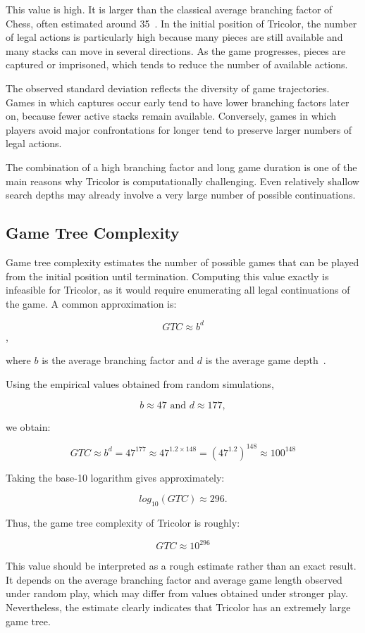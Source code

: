 This value is high. It is larger than the classical average branching factor of Chess, often estimated around 35~\cite{shannon1950chess2}. In the initial position of Tricolor, the number of legal actions is particularly high because many pieces are still available and many stacks can move in several directions. As the game progresses, pieces are captured or imprisoned, which tends to reduce the number of available actions.

The observed standard deviation reflects the diversity of game trajectories. Games in which captures occur early tend to have lower branching factors later on, because fewer active stacks remain available. Conversely, games in which players avoid major confrontations for longer tend to preserve larger numbers of legal actions.

The combination of a high branching factor and long game duration is one of the main reasons why Tricolor is computationally challenging. Even relatively shallow search depths may already involve a very large number of possible continuations.

\subsection{Game Tree Complexity}

Game tree complexity estimates the number of possible games that can be played from the initial position until termination. Computing this value exactly is infeasible for Tricolor, as it would require enumerating all legal continuations of the game. A common approximation is:

\[ GTC \approx b^d \],

where $b$ is the average branching factor and $d$ is the average game depth~\cite{shannon1950chess2}.

Using the empirical values obtained from random simulations,

\[ b\approx47 \text{ and } d\approx177, \]

we obtain:

\[ GTC \approx b^d = 47^{177} \approx 47^{1.2 \times 148} = ({47^{1.2}})^{148} \approx 100^{148}\]

Taking the base-10 logarithm gives approximately:

 \[ log_{10}(GTC) \approx 296. \]

Thus, the game tree complexity of Tricolor is roughly:

 \[ GTC \approx 10^{296} \]

This value should be interpreted as a rough estimate rather than an exact result. It depends on the average branching factor and average game length observed under random play, which may differ from values obtained under stronger play. Nevertheless, the estimate clearly indicates that Tricolor has an extremely large game tree.

